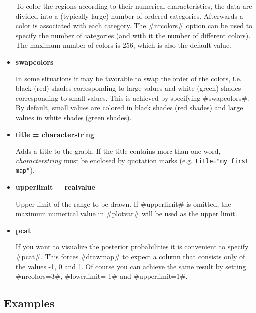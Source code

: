 \begin{itemize}
To color the regions according to their numerical characteristics,
the data are divided into a (typically large) number of ordered
categories. Afterwards a color is associated with each category.
The #nrcolors# option can be used to specify the number of
categories (and with it the number of different colors). The
maximum number of colors is 256, which is also the default value.
\item {\bf swapcolors}

In some situations it may be favorable to swap the order of the
colors, i.e. black (red) shades corresponding to large values and
white (green) shades corresponding to small values. This is
achieved by specifying #swapcolors#. By default, small values are
colored in black shades (red shades) and large values in white
shades (green shades). \item {\bf title = characterstring}

Adds a title to the graph. If the title contains more than one
word, {\em characterstring} must be enclosed by quotation marks (e.g.
\texttt{title="my first map"}). \item {\bf upperlimit = realvalue}

Upper limit of the range to be drawn. If #upperlimit# is omitted,
the maximum numerical value in #plotvar# will be used as the
upper limit. \item {\bf pcat}

If you want to visualize the posterior probabilities it is
convenient to specify #pcat#. This forces #drawmap# to expect a
column that consists only of the values -1, 0 and 1. Of course you
can achieve the same result by setting #nrcolors=3#,
#lowerlimit=-1# and #upperlimit=1#.
\end{itemize}


\subsection*{Examples}


